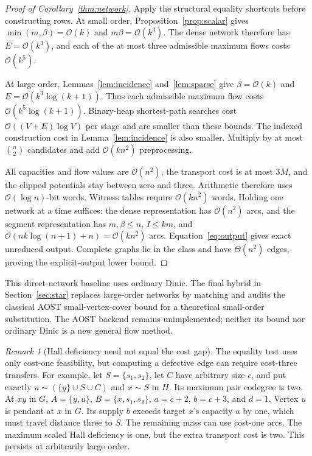 \documentclass[11pt]{article}
\theoremstyle{remark}
\newtheorem{remark}[theorem]{Remark}
\newcommand{\Oh}{\mathcal O}
\begin{document}
\begin{proof}[Proof of Corollary~\ref{thm:network}]
Apply the structural equality shortcuts before constructing rows. At small order, Proposition~\ref{prop:scalar} gives $\min(m,\beta)=\Oh(k)$ and $m\beta=\Oh(k^3)$. The dense network therefore has $E=\Oh(k^3)$, and each of the at most three admissible maximum flows costs $\Oh(k^5)$.

At large order, Lemmas~\ref{lem:incidence} and~\ref{lem:sparse} give $\beta=\Oh(k)$ and $E=\Oh(k^3\log(k+1))$. Thus each admissible maximum flow costs $\Oh(k^5\log(k+1))$. Binary-heap shortest-path searches cost $\Oh((V+E)\log V)$ per stage and are smaller than these bounds. The indexed construction cost in Lemma~\ref{lem:incidence} is also smaller. Multiply by at most $\binom n2$ candidates and add $\Oh(kn^2)$ preprocessing.

All capacities and flow values are $\Oh(n^2)$, the transport cost is at most $3M$, and the clipped potentials stay between zero and three. Arithmetic therefore uses $\Oh(\log n)$-bit words. Witness tables require $\Oh(kn^2)$ words. Holding one network at a time suffices: the dense representation has $\Oh(n^2)$ arcs, and the segment representation has $m,\beta\le n$, $I\le km$, and $\Oh(nk\log(n+1)+n)=\Oh(kn^2)$ arcs. Equation~\eqref{eq:output} gives exact unreduced output. Complete graphs lie in the class and have $\Theta(n^2)$ edges, proving the explicit-output lower bound.
\end{proof}

This direct-network baseline uses ordinary Dinic. The final hybrid in Section~\ref{sec:star} replaces large-order networks by matching and audits the classical AOST small-vertex-cover bound for a theoretical small-order substitution. The AOST backend remains unimplemented; neither its bound nor ordinary Dinic is a new general flow method.

\begin{remark}[Hall deficiency need not equal the cost gap]
The equality test uses only cost-one feasibility, but computing a defective edge can require cost-three transfers. For example, let $S=\{s_1,s_2\}$, let $C$ have arbitrary size $c$, and put exactly $u\mathrel{\sim}(\{y\}\cup S\cup C)$ and $x\mathrel{\sim}S$ in $H$. Its maximum pair codegree is two. At $xy$ in $G$, $A=\{y,u\}$, $B=\{x,s_1,s_2\}$, $a=c+2$, $b=c+3$, and $d=1$. Vertex $u$ is pendant at $x$ in $G$. Its supply $b$ exceeds target $x$'s capacity $a$ by one, which must travel distance three to $S$. The remaining mass can use cost-one arcs. The maximum scaled Hall deficiency is one, but the extra transport cost is two. This persists at arbitrarily large order.
\end{remark}
\end{document}
